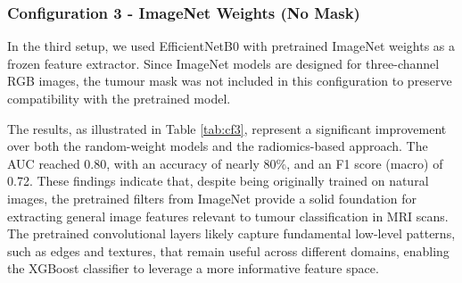 \documentclass[12pt, a4paper]{report}
\begin{document}
\begin{table}[H]
\centering
{}
\caption{Configuration 2 - Incorporating Tumour Mask, No weights}
\label{tab:cf2}
\end{table}


\subsubsection{Configuration 3 - ImageNet Weights (No Mask)}

In the third setup, we used EfficientNetB0 with pretrained ImageNet weights as a frozen feature extractor. Since ImageNet models are designed for three-channel RGB images, the tumour mask was not included in this configuration to preserve compatibility with the pretrained model.

The results, as illustrated in Table \ref{tab:cf3}, represent a significant improvement over both the random-weight models and the radiomics-based approach. The AUC reached 0.80, with an accuracy of nearly 80\%, and an F1 score (macro) of 0.72. These findings indicate that, despite being originally trained on natural images, the pretrained filters from ImageNet provide a solid foundation for extracting general image features relevant to tumour classification in MRI scans. The pretrained convolutional layers likely capture fundamental low-level patterns, such as edges and textures, that remain useful across different domains, enabling the XGBoost classifier to leverage a more informative feature space.

\begin{table}[H]
\centering
{}
\caption{Configuration 3 - ImageNet weights}
\label{tab:cf3}
\end{table}
\end{document}
